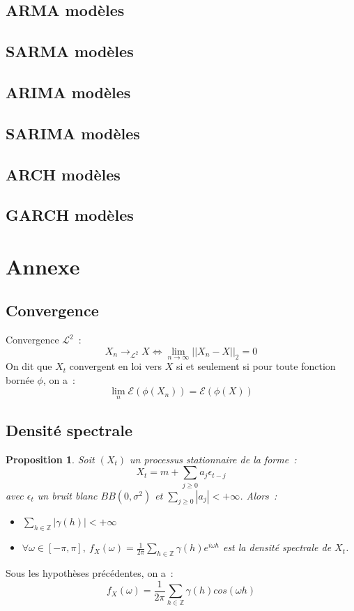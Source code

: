 \documentclass[11pt]{scrartcl} %
\newtheorem{pro}[theorem]{Proposition}
\begin{document}
\subsection{ARMA modèles}
\subsection{SARMA modèles}
\subsection{ARIMA modèles}
\subsection{SARIMA modèles}
\subsection{ARCH modèles}
\subsection{GARCH modèles}

\section{Annexe}
\subsection{Convergence}
Convergence $\mathcal{L}^2$~:
$$
X_n\rightarrow_{\mathcal{L^2}} X \Leftrightarrow  \lim_{n\rightarrow \infty}||X_n-X||_2=0
$$
On dit que $X_t$ convergent en loi vers $X$ si et seulement si pour toute fonction bornée $\phi$, on a~:~
$$
\lim_{n}\mathcal{E}(\phi(X_n))=\mathcal{E}\left(\phi(X)\right)
$$
\subsection{Densité spectrale}
\begin{pro}
Soit $(X_t)$ un processus stationnaire de la forme~:
$$
X_t = m+\sum_{j\geq 0}a_j\epsilon_{t-j}
$$
avec $\epsilon_t$ un bruit blanc $BB(0,\sigma^2)$ et $\sum_{j\geq 0}|a_j|<+\infty$. Alors~:
\begin{itemize}
\item $\sum_{h\in\mathbb{Z}}|\gamma(h)|<+\infty$\\
\item $\forall \omega\in[-\pi,\pi],~f_X(\omega)=\frac{1}{2\pi}\sum_{h\in\mathbb{Z}}\gamma(h)e^{i\omega h}$ est la densité spectrale de $X_t$.
\end{itemize}
\end{pro}
Sous les hypothèses précédentes, on a~:
$$
f_X(\omega)=\frac{1}{2\pi}\sum_{h\in\mathbb{Z}}\gamma(h)cos(\omega h)
$$
\end{document}
